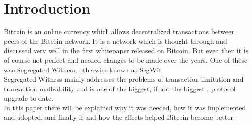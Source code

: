 
\section{Introduction}
\label{ch:Introduction}


Bitcoin is an online currency which allows decentralized transactions between peers of the Bitcoin network. It is a network which is thought through and discussed very well in the first whitepaper released on Bitcoin. \cite{nakamoto} But even then it is of course not perfect and needed changes to be made over the years. One of these was Segregated Witness, otherwise known as SegWit. \\
Segregated Witness mainly addresses the problems of transaction limitation and transaction malleability and is one of the biggest, if not the biggest \cite{bitoinmagazine}, protocol upgrade to date. \\
In this paper there will be explained why it was needed, how it was implemented and adopted, and finally if and how the effects helped Bitcoin become better.